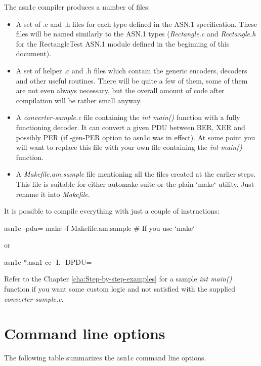 \documentclass[english,oneside,12pt]{book}
\begin{document}
The asn1c compiler produces a number of files:
\begin{itemize}
\item A set of .c and .h files for each type defined
in the ASN.1 specification. These files will be named similarly to
the ASN.1 types (\emph{Rectangle.c} and \emph{Rectangle.h} for the
RectangleTest ASN.1 module defined in the beginning of this document).
\item A set of helper .c and .h files which contain the generic encoders,
decoders and other useful routines. There will be quite a few of them, some
of them are not even always necessary, but the overall amount of code
after compilation will be rather small anyway.
\item A \emph{converter-sample.c} file containing the \emph{int main()} function with a fully functioning decoder. It can convert a given PDU between BER, XER and possibly PER (if -gen-PER option to asn1c was in effect). At some point you will want to replace this file with your own file containing the \emph{int main()} function.
\item A \emph{Makefile.am.sample} file mentioning all the files created
at the earlier steps. This file is suitable for either automake suite
or the plain `make` utility. Just rename it into \emph{Makefile}.
\end{itemize}
It is possible to compile everything with just a couple of instructions:
\begin{bash}
asn1c -pdu=%
make -f Makefile.am.sample                    # If you use `make`
\end{bash}
or
\begin{bash}
asn1c *.asn1
cc -I. -DPDU=%
\end{bash}
Refer to the Chapter \vref{cha:Step-by-step-examples} for a sample
\emph{int main()} function if you want some custom logic and not satisfied
with the supplied \emph{converter-sample.c}.

\clearpage{}
\section{\label{sec:Command-line-options}Command line options}

The following table summarizes the asn1c command line options.
\end{document}
